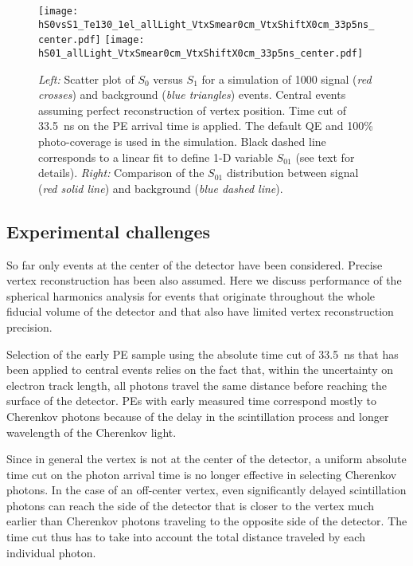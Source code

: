 \begin{figure*}[h]
  \centering
  \texttt{[image: hS0vsS1\_Te130\_1el\_allLight\_VtxSmear0cm\_VtxShiftX0cm\_33p5ns\_center.pdf]}
  \texttt{[image: hS01\_allLight\_VtxSmear0cm\_VtxShiftX0cm\_33p5ns\_center.pdf]}
  \caption{\emph{Left:} Scatter plot of $S_0$ versus $S_1$ for a simulation of 1000 signal (\emph{red crosses}) and background 
    (\emph{blue triangles}) events.
    Central events assuming perfect reconstruction of vertex position. Time cut of 33.5~ns on the PE arrival time is
    applied. The default QE and 100\% photo-coverage is used in the simulation.
    Black dashed line corresponds to a linear fit to define 1-D variable $S_{01}$ (see text for details).
    \emph{Right:} Comparison of the $S_{01}$ distribution between signal (\emph{red solid line}) and background (\emph{blue dashed line}).}
\label{fig:SL_Te_33p5ns_center}
\end{figure*}



\subsection{Experimental challenges}

So far only events at the center of the detector have been considered. Precise vertex reconstruction has been also assumed. 
Here we discuss performance of the spherical harmonics analysis for events that originate throughout the whole fiducial volume
of the detector and that also have limited vertex reconstruction precision.

Selection of the early PE sample using the absolute time cut of 33.5~ns that has been applied to central events relies on the fact that, 
within the uncertainty on electron track length, all photons travel the same distance before reaching the surface of the detector. 
PEs with early measured time correspond mostly to Cherenkov photons because of the delay in the scintillation process and longer 
wavelength of the Cherenkov light. 

Since in general the vertex is not at the center of the detector, a uniform absolute time cut on the photon arrival time is no longer 
effective in selecting Cherenkov photons. In the case of an off-center vertex, even significantly delayed scintillation photons can
reach the side of the detector that is closer to the vertex much earlier than Cherenkov photons traveling to the opposite side of the 
detector. The time cut thus has to take into account the total distance traveled by each individual photon.

